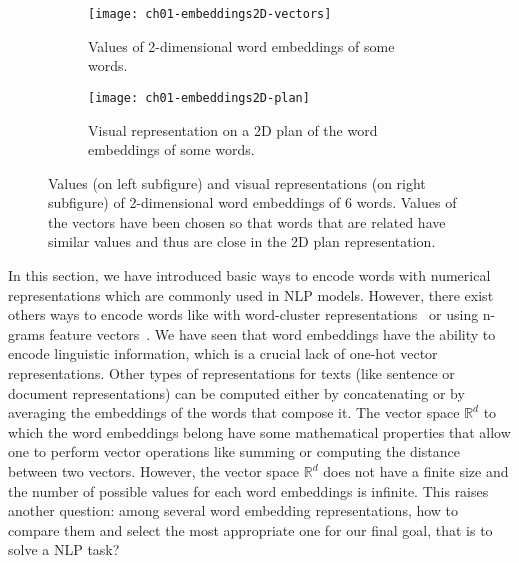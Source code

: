   \begin{figure}[b!]
    \centering
    \begin{subfigure}[b]{0.38\textwidth}
      \centering
      \texttt{[image: ch01-embeddings2D-vectors]}
      \caption{Values of 2-dimensional word embeddings of some words.}
      \label{ch01:subfig:values-embeddings-2D}
    \end{subfigure} \hfill
    \begin{subfigure}[b]{0.58\textwidth}
      \centering
      \texttt{[image: ch01-embeddings2D-plan]}
      \caption{Visual representation on a 2D plan of the word embeddings of some
      words.}
      \label{ch01:subfig:plan-embeddings-2D}
    \end{subfigure}
    \caption[Values and visual representations of 2-dimensional word
    embeddings.] {Values (on left subfigure) and visual representations (on
    right subfigure) of 2-dimensional word embeddings of 6 words. Values of the
    vectors have been chosen so that words that are related have similar values
    and thus are close in the 2D plan representation.}
    \label{ch01:fig:word-embeddings-2D}
  \end{figure}

  In this section, we have introduced basic ways to encode words with numerical
  representations which are commonly used in NLP models. However, there exist
  others ways to encode words like with word-cluster
  representations~\citep{bekkerman2003distributional} or using n-grams feature
  vectors~\citep{cavnar1995using}. We have seen that word embeddings have the
  ability to encode linguistic information, which is a crucial lack of one-hot
  vector representations. Other types of representations for texts (like
  sentence or document representations) can be computed either by concatenating
  or by averaging the embeddings of the words that compose it. The vector space
  $\mathbb{R}^d$ to which the word embeddings belong have some mathematical
  properties that allow one to perform vector operations like summing or
  computing the distance between two vectors. However, the vector space
  $\mathbb{R}^d$ does not have a finite size and the number of possible values
  for each word embeddings is infinite. This raises another question: among
  several word embedding representations, how to compare them and select the
  most appropriate one for our final goal, that is to solve a NLP task?

